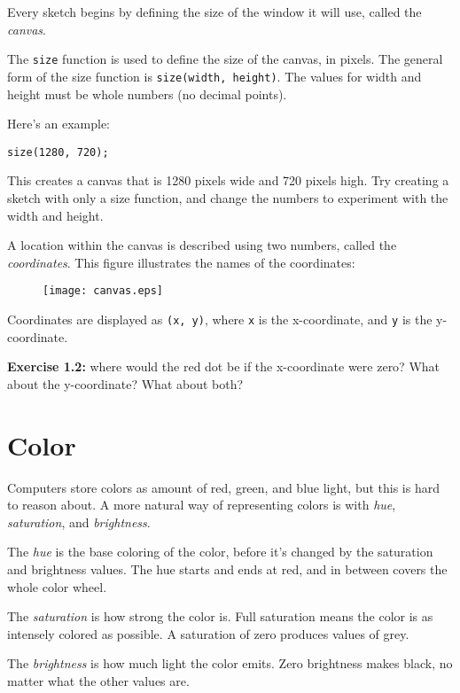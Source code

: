\documentclass[
]{leaflet}
\begin{document}
Every sketch begins by defining the size of the window it will use, called the \textit{canvas}.

The \texttt{size} function is used to define the size of the canvas, in pixels.
The general form of the size function is \texttt{size(width, height)}.
The values for width and height must be whole numbers (no decimal points).

Here's an example:
\begin{lstlisting}
size(1280, 720);
\end{lstlisting}
\vspace{-0.5em}
This creates a canvas that is 1280 pixels wide and 720 pixels high.
Try creating a sketch with only a size function, and change the numbers to experiment with the width and height.

A location within the canvas is described using two numbers, called the \textit{coordinates}.
This figure illustrates the names of the coordinates:

\begin{figure}[!h]
  \centering
  \texttt{[image: canvas.eps]}
\end{figure}

Coordinates are displayed as \texttt{(x, y)}, where \texttt{x} is the x-coordinate, and \texttt{y} is the y-coordinate.

\textbf{Exercise 1.2:} where would the red dot be if the x-coordinate were zero?
What about the y-coordinate?
What about both?

\section{Color}

Computers store colors as amount of red, green, and blue light, but this is hard to reason about.
A more natural way of representing colors is with \textit{hue}, \textit{saturation}, and \textit{brightness}.

The \textit{hue} is the base coloring of the color, before it's changed by the saturation and brightness values.
The hue starts and ends at red, and in between covers the whole color wheel.

The \textit{saturation} is how strong the color is.
Full saturation means the color is as intensely colored as possible.
A saturation of zero produces values of grey.

The \textit{brightness} is how much light the color emits.
Zero brightness makes black, no matter what the other values are.
\end{document}
